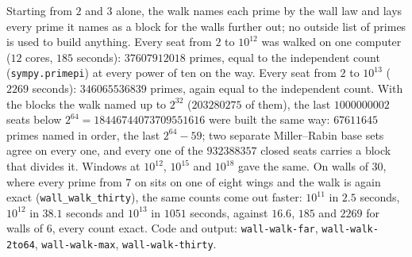 \documentclass[11pt]{article}
\begin{document}
Starting from $2$ and $3$ alone, the walk names each prime by the wall law and lays every prime it names as a block for the walls further out; no outside list of primes is used to build anything. Every seat from $2$ to $10^{12}$ was walked on one computer ($12$ cores, $185$ seconds): $37607912018$ primes, equal to the independent count (\texttt{sympy.primepi}) at every power of ten on the way. Every seat from $2$ to $10^{13}$ ($2269$ seconds): $346065536839$ primes, again equal to the independent count. With the blocks the walk named up to $2^{32}$ ($203280275$ of them), the last $1000000002$ seats below $2^{64} = 18446744073709551616$ were built the same way: $67611645$ primes named in order, the last $2^{64}-59$; two separate Miller--Rabin base sets agree on every one, and every one of the $932388357$ closed seats carries a block that divides it. Windows at $10^{12}$, $10^{15}$ and $10^{18}$ gave the same. On walls of $30$, where every prime from $7$ on sits on one of eight wings and the walk is again exact (\texttt{wall\_walk\_thirty}), the same counts come out faster: $10^{11}$ in $2.5$ seconds, $10^{12}$ in $38.1$ seconds and $10^{13}$ in $1051$ seconds, against $16.6$, $185$ and $2269$ for walls of $6$, every count exact. Code and output: \texttt{wall-walk-far}, \texttt{wall-walk-2to64}, \texttt{wall-walk-max}, \texttt{wall-walk-thirty}.
\end{document}
